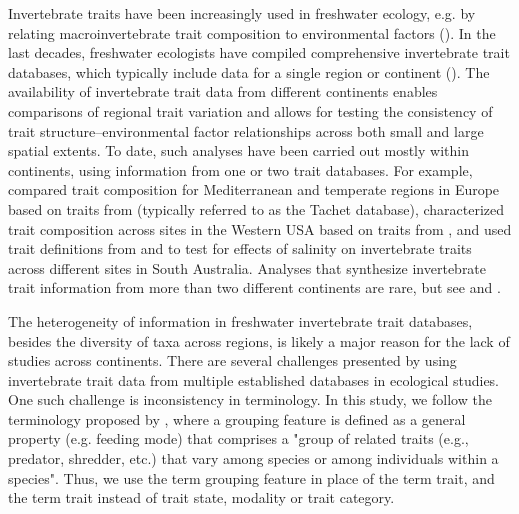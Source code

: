 \documentclass{article}
\begin{document}
Invertebrate traits have been increasingly used in freshwater ecology, e.g. by relating macroinvertebrate trait composition to environmental factors (\cite{bhowmik_large_2015, poff_developing_2010, szocs_effects_2014}). In the last decades, freshwater ecologists have compiled comprehensive invertebrate trait databases, which typically include data for a single region or continent (\cite{kefford_integrated_2020, Philips_and_Smith_NZ_DB_2018, schmidt-kloiber_www.freshwaterecology.info_2015, tomanova_trophic_2006, ussegliopolatera_biological_2000, vieira_database_nodate}). The availability of invertebrate trait data from different continents enables comparisons of regional trait variation and allows for testing the consistency of trait structure–environmental factor relationships across both small and large spatial extents. To date, such analyses have been carried out mostly within continents, using information from one or two trait databases. For example, \citet{bonada_taxonomic_2007} compared trait composition for Mediterranean and temperate regions in Europe based on traits from \citet{ussegliopolatera_biological_2000} (typically referred to as the Tachet database), \citet{poff_developing_2010} characterized trait composition across sites in the Western USA based on traits from \citet{poff_functional_2006}, and \citet{botwe_effects_2018} used trait definitions from \citet{poff_functional_2006} and \citet{schafer_trait_2011} to test for effects of salinity on invertebrate traits across different sites in South Australia. Analyses that synthesize invertebrate trait information from more than two different continents are rare, but see \citet{brown_functional_2018} and \citet{statzner_reproductive_1997}. 

The heterogeneity of information in freshwater invertebrate trait databases, besides the diversity of taxa across regions, is likely a major reason for the lack of studies across continents. There are several challenges presented by using invertebrate trait data from multiple established databases in ecological studies. One such challenge is inconsistency in terminology. In this study, we follow the terminology proposed by \citet{schmera_proposed_2015}, where a grouping feature is defined as a general property (e.g. feeding mode) that comprises a "group of related traits (e.g., predator, shredder, etc.) that vary among species or among individuals within a species". Thus, we use the term grouping feature in place of the term trait, and the term trait instead of trait state, modality or trait category. 
\end{document}
